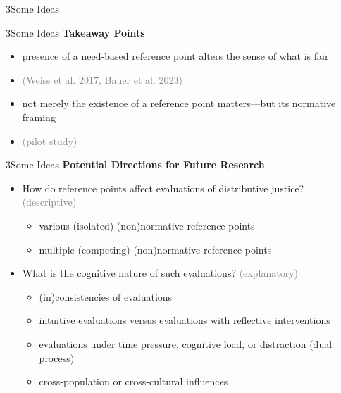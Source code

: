 \documentclass[xcolor=table,9pt,aspectratio=169]{beamer}
\begin{document}
\begin{frame}
   \begin{overlayarea}{\textwidth}{0.81\paperheight}{
      \vspace*{11mm}
      \textcolor{uolblue}
      {3\hspace*{1em}Some Ideas}
   }
   \end{overlayarea}
\end{frame}


\begin{frame}{\vspace*{10mm}3\hspace*{1em}Some Ideas}
   \textbf{Takeaway Points}
   
   \medskip
   \begin{itemize}
      \item presence of a need-based reference point alters the sense of what is fair
      \item[] \textcolor{gray}{(Weiss et al. 2017, Bauer et al. 2023)}
      \item not merely the existence of a reference point matters---but its normative framing
      \item[] \textcolor{gray}{(pilot study)}
   \end{itemize}
\end{frame}


\begin{frame}{\vspace*{10mm}3\hspace*{1em}Some Ideas}
   \textbf{Potential Directions for Future Research}
   
   \medskip
   \begin{itemize}
      \item How do reference points affect evaluations of distributive justice? \textcolor{gray}{(descriptive)}
      \begin{itemize}
         \item various (isolated) (non)normative reference points
         \item multiple (competing) (non)normative reference points
      \end{itemize}
      \item What is the cognitive nature of such evaluations? \textcolor{gray}{(explanatory)}
      \begin{itemize}
         \item (in)consistencies of evaluations
         \item intuitive evaluations versus evaluations with reflective interventions
         \item evaluations under time pressure, cognitive load, or distraction (dual process)
         \item cross-population or cross-cultural influences
      \end{itemize}
   \end{itemize}
\end{frame}
\end{document}
